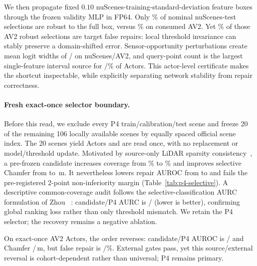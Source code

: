 We then propagate fixed $0.10$ nuScenes-training-standard-deviation feature boxes through the frozen validity MLP in FP64.
Only \PsevenCTestCertified{}\% of nominal nuScenes-test selections are robust to the full box, versus
\PsevenCAVCertified{}\% on consumed AV2. Yet \PsevenCAVStableFalse{}\% of those AV2 robust selections are target false repairs:
local threshold invariance can stably preserve a domain-shifted error. Sensor-opportunity perturbations create mean logit widths
of \PsevenCTestOpportunityWidth{}/\PsevenCAVOpportunityWidth{} on nuScenes/AV2, and query-point count is the largest
single-feature interval source for \PsevenCTestQueryTop{}/\PsevenCAVQueryTop{}\% of Actors. This actor-level certificate makes
the shortcut inspectable, while explicitly separating network stability from repair correctness.

\paragraph{Fresh exact-once selector boundary.}
Before this read, we exclude every P4 train/calibration/test scene and freeze 20 of the remaining 106 locally available scenes
by equally spaced official scene index. The 20 scenes yield \PeightActors{} Actors and are read once, with no replacement or
model/threshold update. Motivated by source-only LiDAR sparsity consistency~\cite{kim2023dglss}, a pre-frozen candidate increases
coverage from \PeightPfourCoverage{}\% to \PeightCandidateCoverage{}\% and improves selective Chamfer from
\PeightPfourChamfer{} to \PeightCandidateChamfer{}\,m. It nevertheless lowers repair AUROC from
\PeightPfourRepairAUROC{} to \PeightCandidateRepairAUROC{} and fails the pre-registered 2-point non-inferiority margin
(Table~\ref{tab:p4-selective}). A descriptive common-coverage audit follows the selective-classification AURC formulation
of Zhou \etal~\cite{zhou2025aurc}: candidate/P4 AURC is \PeightCandidateAURC{}/\PeightPfourAURC{} (lower is better), confirming
global ranking loss rather than only threshold mismatch. We retain the P4 selector; the recovery remains a negative ablation.

On \PsixFreshActors{} exact-once AV2 Actors, the order reverses: candidate/P4 AUROC is
\PsixFreshCandidateRepairAUROC{}/\PsixFreshPfourRepairAUROC{} and Chamfer
\PsixFreshCandidateChamfer{}/\PsixFreshPfourChamfer{}\,m, but false repair is
\PsixFreshCandidateFalseRepair{}/\PsixFreshPfourFalseRepair{}\%. External gates pass, yet this source/external reversal is
cohort-dependent rather than universal; P4 remains primary.

